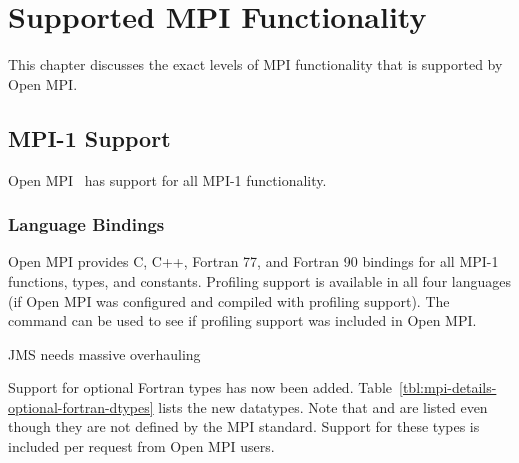 %
% 
% 
%

\chapter{Supported MPI Functionality}
\label{sec:mpi-functionality}

This chapter discusses the exact levels of MPI functionality that is
supported by Open MPI.


\section{MPI-1 Support}

Open MPI \ompiversion\ has support for all MPI-1 functionality.


\subsection{Language Bindings}
\label{sec:mpi-details-mpi1-language}

Open MPI provides C, C++, Fortran 77, and Fortran 90 bindings for all
MPI-1 functions, types, and constants.
%
Profiling support is available in all four languages (if Open MPI was
configured and compiled with profiling support).  The 
command can be used to see if profiling support was included in
Open MPI.

{\Huge JMS needs massive overhauling}

Support for optional Fortran types has now been added.
Table~\ref{tbl:mpi-details-optional-fortran-dtypes} lists the new
datatypes.  Note that  and
 are listed even though they are not
defined by the MPI standard.  Support for these types is included per
request from Open MPI users.

